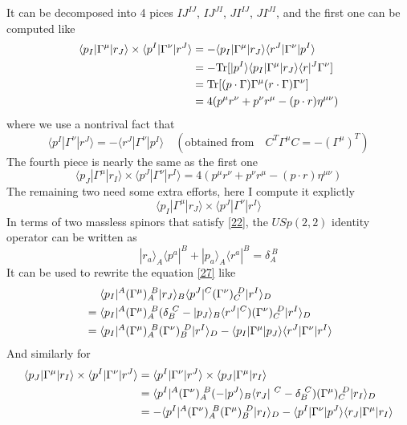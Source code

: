 \documentclass[12pt]{article}
\newcommand{\aket}[1]{|#1\rangle}
\newcommand{\abra}[1]{\langle #1|}
\begin{document}
It can be decomposed into 4 pices $IJ^{\textstyle IJ}$, $IJ^{\textstyle JI}$, $JI^{\textstyle IJ}$, $JI^{\textstyle JI}$, and the first one can be computed like
\begin{align}
    \abra{p_I}\Gamma^\mu\aket{r_J}\times \abra {p^I}\Gamma^\nu\aket{r^{J}}&=-\abra{p_I}\Gamma^\mu\aket{r_J}\abra {r^J}\Gamma^\nu\aket{p^{I}}\notag\\
    &=-\mathrm{Tr}[\aket{p^{I}}\abra{p_I}\Gamma^\mu\aket{r_J}\abra r^J\Gamma^\nu]\notag \\
    &=\mathrm{Tr}[(p\cdot \Gamma)\Gamma^\mu (r\cdot \Gamma)\Gamma^\nu]\notag \\
    &=4(p^\mu r^\nu+p^\nu r^\mu -(p\cdot r)\eta^{\mu\nu})
\end{align}
where we use a nontrival fact that 
\begin{equation}
    \abra {p^I}\Gamma^\nu\aket{r^{J}}=-\abra {r^J}\Gamma^\nu\aket{p^{I}}\quad (\text{obtained from}\quad C^T\Gamma^\mu C=-(\Gamma^\mu)^T)
\end{equation}
The fourth piece is nearly the same as the first one
\begin{equation}
    \abra{p_J}\Gamma^\mu\aket{r_I}\times \abra {p^J}\Gamma^\nu\aket{r^{I}}=4(p^\mu r^\nu+p^\nu r^\mu -(p\cdot r)\eta^{\mu\nu})
\end{equation}
The remaining two need some extra efforts, here I compute it explictly
\begin{equation}
    \abra{p_I}\Gamma^\mu\aket{r_J}\times \abra {p^J}\Gamma^\nu\aket{r^{I}}
    \label{27} 
\end{equation}
In terms of two massless spinors that satisfy \eqref{22}, the $USp(2,2)$ identity operator can be written as
\begin{equation}
    \aket{r_a}_A\abra{p^a}^B+\aket{p_a}_A\abra{r^a}^B=\delta_A^{\ B}
\end{equation}
It can be used to rewrite the equation \eqref{27} like
\begin{align}
    &\quad \ \abra{p_I}^A(\Gamma^\mu)_A^{\ B}\aket{r_J}_B\abra{p^J}^C(\Gamma^\nu)_C^{\ D}\aket{r^I}_D \notag \\
    &=\abra{p_I}^A(\Gamma^\mu)_A^{\ B} (\delta_B^{\ C}-\aket{p_J}_B\abra{r^J}^C)(\Gamma^\nu)_C^{\ D}\aket{r^I}_D \notag \\
    &=\abra{p_I}^A(\Gamma^\mu)_A^{\ B}(\Gamma^\nu)_B^{\ D}\aket{r^I}_D-\abra{p_I}\Gamma^\mu\aket{p_J}\abra{r^J}\Gamma^\nu\aket{r^I}
\end{align}
And similarly for 
\begin{align}
    \abra{p_J}\Gamma^\mu\aket{r_I}\times \abra {p^I}\Gamma^\nu\aket{r^{J}}&=\abra {p^I}\Gamma^\nu\aket{r^{J}}\times \abra{p_J}\Gamma^\mu\aket{r_I}\notag \\
    &=\abra {p^I}^A(\Gamma^\nu)_A^{\ B}(-\aket{p^J}_B\abra{r_J}^{\ C}-\delta_B^{\ C})(\Gamma^\mu)_C^{\ D}\aket{r_I}_D \notag \\
    &=-\abra {p^I}^A(\Gamma^\nu)_A^{\ B}(\Gamma^\mu)_B^{\ D}\aket{r_I}_D-\abra{p^I}\Gamma^\nu\aket{p^J}\abra{r_J}\Gamma^\mu\aket{r_I}
\end{align}
\end{document}
